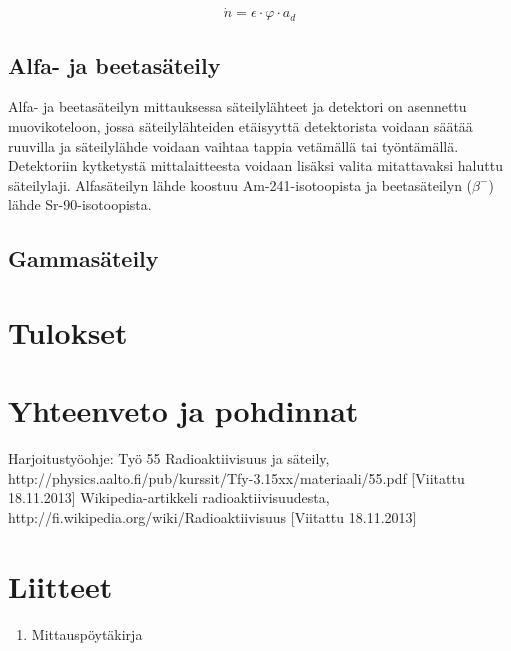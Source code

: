 \documentclass[a4paper,11pt]{article}
\begin{document}
\[ \dot{n} = \epsilon \cdot \varphi \cdot a_d \]

\subsection{Alfa- ja beetasäteily}
\label{alfabeeta}

Alfa- ja beetasäteilyn mittauksessa säteilylähteet ja detektori on asennettu muovikoteloon, jossa säteilylähteiden etäisyyttä detektorista voidaan säätää ruuvilla ja säteilylähde voidaan vaihtaa tappia vetämällä tai työntämällä. Detektoriin kytketystä mittalaitteesta voidaan lisäksi valita mitattavaksi haluttu säteilylaji. Alfasäteilyn lähde koostuu Am-241-isotoopista ja beetasäteilyn ($\beta^-$) lähde Sr-90-isotoopista. 





\subsection{Gammasäteily}
\label{gamma}

\section{Tulokset}

\section{Yhteenveto ja pohdinnat}


\begin{thebibliography}{99}

 Harjoitustyöohje: Työ 55 Radioaktiivisuus ja säteily, http://physics.aalto.fi/pub/kurssit/Tfy-3.15xx/materiaali/55.pdf [Viitattu 18.11.2013]
 Wikipedia-artikkeli radioaktiivisuudesta, http://fi.wikipedia.org/wiki/Radioaktiivisuus [Viitattu 18.11.2013]

\end{thebibliography}

\section*{Liitteet}
\begin{enumerate}
\item{Mittauspöytäkirja}\label{mittaus}

\end{enumerate}
\end{document}
